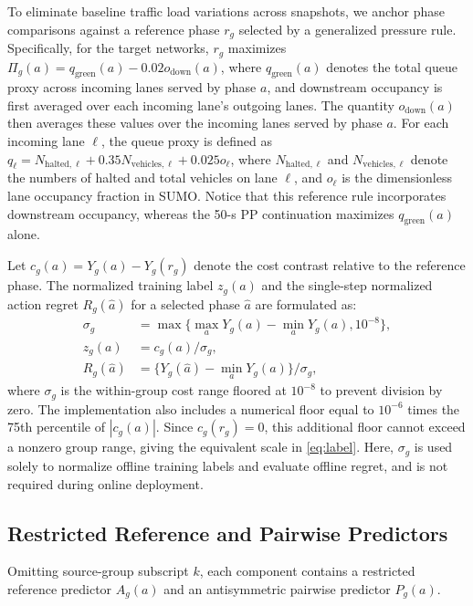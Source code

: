 \documentclass[letterpaper,journal]{IEEEtran}
\begin{document}
To eliminate baseline traffic load variations across snapshots, we anchor phase comparisons against a reference phase $r_g$ selected by a generalized pressure rule. Specifically, for the target networks, $r_g$ maximizes $\Pi_g(a)=q_{\mathrm{green}}(a)-0.02o_{\mathrm{down}}(a)$, where $q_{\mathrm{green}}(a)$ denotes the total queue proxy across incoming lanes served by phase $a$, and downstream occupancy is first averaged over each incoming lane's outgoing lanes. The quantity $o_{\mathrm{down}}(a)$ then averages these values over the incoming lanes served by phase $a$. For each incoming lane $\ell$, the queue proxy is defined as $q_\ell=N_{\mathrm{halted},\ell}+0.35N_{\mathrm{vehicles},\ell}+0.025o_\ell$, where $N_{\mathrm{halted},\ell}$ and $N_{\mathrm{vehicles},\ell}$ denote the numbers of halted and total vehicles on lane $\ell$, and $o_\ell$ is the dimensionless lane occupancy fraction in SUMO. Notice that this reference rule incorporates downstream occupancy, whereas the 50-s PP continuation maximizes $q_{\mathrm{green}}(a)$ alone.

Let $c_g(a)=Y_g(a)-Y_g(r_g)$ denote the cost contrast relative to the reference phase. The normalized training label $z_g(a)$ and the single-step normalized action regret $R_g(\widehat a)$ for a selected phase $\widehat a$ are formulated as:
\begin{align}
 \sigma_g&=\max\{\max_aY_g(a)-\min_aY_g(a),10^{-8}\},\nonumber\\
 z_g(a)&=c_g(a)/\sigma_g,\label{eq:label}\\
 R_g(\widehat a)&=\{Y_g(\widehat a)-\min_aY_g(a)\}/\sigma_g,
 \label{eq:regret}
\end{align}
where $\sigma_g$ is the within-group cost range floored at $10^{-8}$ to prevent division by zero. The implementation also includes a numerical floor equal to $10^{-6}$ times the 75th percentile of $|c_g(a)|$. Since $c_g(r_g)=0$, this additional floor cannot exceed a nonzero group range, giving the equivalent scale in \eqref{eq:label}. Here, $\sigma_g$ is used solely to normalize offline training labels and evaluate offline regret, and is not required during online deployment.

\subsection{Restricted Reference and Pairwise Predictors}
Omitting source-group subscript $k$, each component contains a restricted reference predictor $A_g(a)$ and an antisymmetric pairwise predictor $P_g(a)$.
\end{document}
